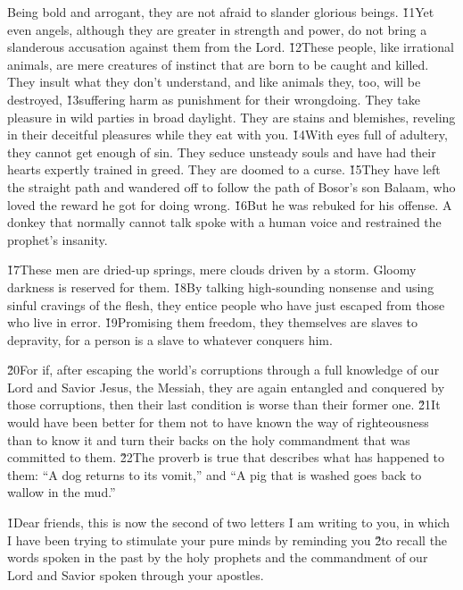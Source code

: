 Being bold and arrogant, they are not afraid to slander glorious beings. \v{11}Yet even angels, although they are greater in strength and power, do not bring a slanderous accusation against them from the Lord. \v{12}These people, like irrational animals, are mere creatures of instinct that are born to be caught and killed. They insult what they don't understand, and like animals they, too, will be destroyed, \v{13}suffering harm as punishment for their wrongdoing. They take pleasure in wild parties in broad daylight. They are stains and blemishes, reveling in their deceitful pleasures while they eat with you. \v{14}With eyes full of adultery, they cannot get enough of sin. They seduce unsteady souls and have had their hearts expertly trained in greed. They are doomed to a curse. \v{15}They have left the straight path and wandered off to follow the path of Bosor's son Balaam, who loved the reward he got for doing wrong. \v{16}But he was rebuked for his offense. A donkey that normally cannot talk spoke with a human voice and restrained the prophet's insanity.

\v{17}These men are dried-up springs, mere clouds driven by a storm. Gloomy darkness is reserved for them. \v{18}By talking high-sounding nonsense and using sinful cravings of the flesh, they entice people who have just escaped from those who live in error. \v{19}Promising them freedom, they themselves are slaves to depravity, for a person is a slave to whatever conquers him.

\v{20}For if, after escaping the world's corruptions through a full knowledge of our Lord and Savior Jesus, the Messiah, they are again entangled and conquered by those corruptions, then their last condition is worse than their former one. \v{21}It would have been better for them not to have known the way of righteousness than to know it and turn their backs on the holy commandment that was committed to them. \v{22}The proverb is true that describes what has happened to them: ``A dog returns to its vomit,'' and ``A pig that is washed goes back to wallow in the mud.''

\v{1}Dear friends, this is now the second of two letters I am writing to you, in which I have been trying to stimulate your pure minds by reminding you \v{2}to recall the words spoken in the past by the holy prophets and the commandment of our Lord and Savior spoken through your apostles.

